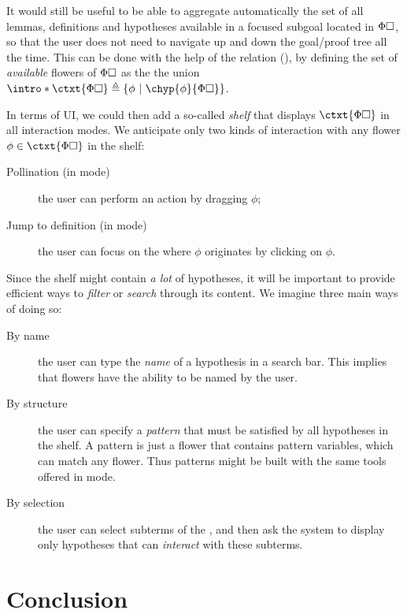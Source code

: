 \begin{scope}
\AP
It would still be useful to be able to aggregate automatically the set of all
lemmas, definitions and hypotheses available in a focused subgoal located in
$\Phi\square$, so that the user does not need to navigate up and down the
goal/proof tree all the time. This can be done with the help of the
 relation (), by defining the set of
\emph{available} flowers of $\Phi\square$ as the the union
$\intro*\ctxt{\Phi\hole} \defeq \compr{\phi}{\chyp{\phi}{\Phi\hole}}$.

In terms of UI, we could then add a so-called \emph{shelf} that displays
$\ctxt{\Phi\hole}$ in all interaction modes. We anticipate only two kinds of
interaction with any flower $\phi \in \ctxt{\Phi\hole}$ in the shelf:
\begin{description}
  \item[Pollination (in  mode)] the user can perform an
   action by dragging $\phi$;
  \item[Jump to definition (in  mode)] the user can focus on
  the  where $\phi$ originates by clicking on $\phi$.
\end{description}

Since the shelf might contain \emph{a lot} of hypotheses, it will be important
to provide efficient ways to \emph{filter} or \emph{search} through its content.
We imagine three main ways of doing so:
\begin{description}
  \item[By name] the user can type the \emph{name} of a hypothesis in a
  search bar. This implies that flowers have the ability to be named by the
  user.
  \item[By structure] the user can specify a \emph{pattern} that must
  be satisfied by all hypotheses in the shelf. A pattern is just a flower that
  contains pattern variables, which can match any flower. Thus patterns might be
  built with the same tools offered in  mode.
  \item[By selection] the user can select subterms of the , and then
  ask the system to display only hypotheses that can \emph{interact} with these
  subterms.
\end{description}


\section{Conclusion}


\end{scope}
